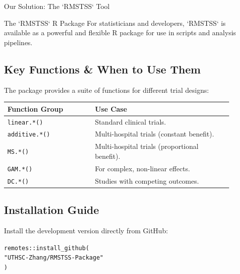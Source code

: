 \documentclass[a0,landscape]{a0poster}
\begin{document}
\begin{minipage}[t][\dimexpr\textheight-1cm\relax][t]{0.34\linewidth}
\begin{posterbox}{Our Solution: The `RMSTSS` Tool}
    \vfill 
    \begin{center}
    \end{center}
\end{posterbox}

\end{minipage}
\hfill 
\begin{minipage}[t][\dimexpr\textheight-1cm\relax][t]{0.32\linewidth} %

\begin{posterbox}{The `RMSTSS` R Package}
    \huge
    For statisticians and developers, `RMSTSS` is available as a powerful and flexible R package for use in scripts and analysis pipelines.
    
    \subsection*{\huge Key Functions \& When to Use Them}
    \Large
    The package provides a suite of functions for different trial designs:
    
    \vspace{0.5cm}
    \begin{tabular}{|p{0.35\linewidth}|p{0.55\linewidth}|}
        \hline
        \textbf{\Large Function Group} & \textbf{\Large Use Case} \\
        \hline
        \texttt{linear.*()} & Standard clinical trials. \\ \hline
        \texttt{additive.*()} & Multi-hospital trials (constant benefit). \\ \hline
        \texttt{MS.*()} & Multi-hospital trials (proportional benefit). \\ \hline
        \texttt{GAM.*()} & For complex, non-linear effects. \\ \hline
        \texttt{DC.*()} & Studies with competing outcomes. \\
        \hline
    \end{tabular}

    \subsection*{\huge Installation Guide}
    \Large
    Install the development version directly from GitHub:
    \begin{alltt}
remotes::install_github(
  "UTHSC-Zhang/RMSTSS-Package"
)
    \end{alltt}


\end{posterbox}
\end{minipage}
\end{document}
